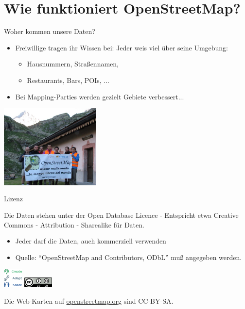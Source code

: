 \documentclass{beamer}
\begin{document}
\section{Wie funktioniert OpenStreetMap?}

\begin{frame}{Woher kommen unsere Daten?}

\begin{itemize}
  \item Freiwillige tragen ihr Wissen bei: Jeder weis viel über seine Umgebung:
	\begin{itemize}
	  \item Hausnummern, Straßennamen,
	  \item Restaurants, Bars, POIs, ...
  \end{itemize}
  \pause
  \item Bei Mapping-Parties werden gezielt Gebiete verbessert...
\end{itemize}

 \begin{center}
 \includegraphics[width=5cm]{alps_mp.jpg}
 \end{center}

\end{frame}

\begin{frame}{Lizenz}

Die Daten stehen unter der Open Database Licence - Entspricht etwa Creative Commons - Attribution - Sharealike für Daten.
\begin{itemize}
  \item Jeder darf die Daten, auch kommerziell verwenden
  \item Quelle: ``OpenStreetMap and Contributors, ODbL'' muß angegeben werden.
\end{itemize}

 \begin{center}
 \includegraphics[width=1cm]{ODbL.png}
 \hspace{2cm}
 \includegraphics[width=1.5cm]{cc-by-sa.png}
 \end{center}

\pause
Die Web-Karten auf \href{http://osm.org}{openstreetmap.org} sind CC-BY-SA.

\end{frame}
\end{document}
